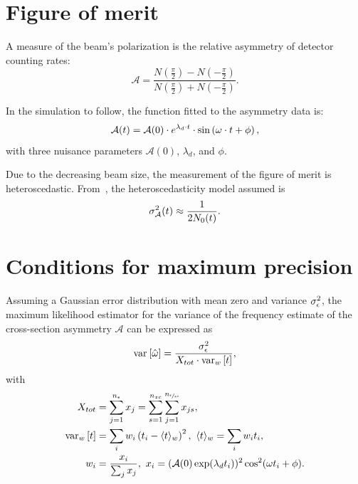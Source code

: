 \documentclass[a4paper]{jacow}
\newcommand{\meas}{\epsilon}
\newcommand{\dt}{\Delta t}
\newcommand{\Nmnd}{{n_{\sfrac{\meas}{zc}}}}
\newcommand{\Nnd}{{n_{zc}}}
\newcommand{\Nm}{{n_{\meas}}}
\newcommand{\lamd}{\lambda_d}
\begin{document}
\section{Figure of merit}
\newcommand{\Asym}{\mathcal{A}}
A measure of the beam's polarization is the relative asymmetry of detector counting rates:~\cite[p.~17]{Eversmann}
\begin{equation}\label{eq:AsymDef}
	\Asym = \frac{N(\frac\pi2) - N(-\frac\pi2)}{N(\frac\pi2)+N(-\frac\pi2)}.
\end{equation}

In the simulation to follow, the function fitted to the asymmetry data is:
\begin{equation}\label{eq:xFOM}
	\Asym(t) = \Asym(0)\cdot e^{\lamd\cdot t}\cdot\sin\bkt{\omega\cdot t + \phi},
\end{equation}
with three nuisance parameters $\Asym(0)$, $\lamd$, and $\phi$. 

Due to the decreasing beam size, the measurement of the figure of merit is heteroscedastic. From~\cite[p.~18]{Eversmann}, the heteroscedasticity model assumed is
\begin{equation}\label{eq:AsymHtsk}
	\SD{\Asym}^2(t) \approx \frac{1}{2N_0(t)}.
\end{equation}

\section{Conditions for maximum precision}
\DeclareDocumentCommand{\stat}{s}{\IfBooleanTF{#1}{X_{tot}}{\frac{\SD{\meas}^2}{\SE{\hat\omega}^2\cdot \var[w]{t}}}}
\newcommand{\dtnd}{\dt_{zc}}
\newcommand{\SNR}{\text{SNR}}
\newcommand{\deq}{\overset{\triangle}{=}}

Assuming a Gaussian error distribution with mean zero and variance $\SD{\meas}^2$, the maximum likelihood estimator for the variance of the frequency estimate of the cross-section asymmetry $\Asym$ can be expressed as
\[\var{\hat\omega} = \frac{\SD{\meas}^2}{X_{tot}\cdot \var[w]{t}}, \]
with
\begin{align*}
X_{tot} &= \sum_{j=1}^{\Nm} x_j = \sum_{s=1}^{\Nnd}\sum_{j=1}^{\Nmnd} x_{js}, \\
\var[w]{t} &= \sum_i w_i \bkt{t_i - \avg{t}[w]}^2,~ \avg{t}[w] = \sum_i w_i t_i, \\
w_i &= \frac{x_i}{\sum_j x_j},~ x_i = (\Asym(0)\exp(\lamd t_i))^2\cos^2(\omega t_i + \phi). %
\end{align*}
\end{document}

